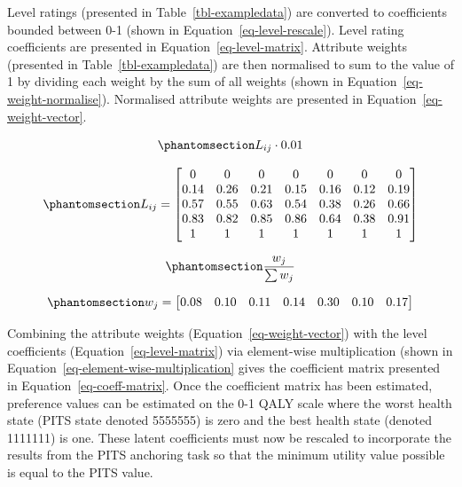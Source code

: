 \documentclass[
  letterpaper,
  DIV=11,
  numbers=noendperiod]{scrartcl}
\begin{document}
Level ratings (presented in Table~\ref{tbl-exampledata}) are converted
to coefficients bounded between 0-1 (shown in
Equation~\ref{eq-level-rescale}). Level rating coefficients are
presented in Equation~\ref{eq-level-matrix}. Attribute weights
(presented in Table~\ref{tbl-exampledata}) are then normalised to sum to
the value of 1 by dividing each weight by the sum of all weights (shown
in Equation~\ref{eq-weight-normalise}). Normalised attribute weights are
presented in Equation~\ref{eq-weight-vector}.

\begin{equation}\phantomsection\label{eq-level-rescale}{
    L_{ij} \cdot 0.01
}\end{equation}

\begin{equation}\phantomsection\label{eq-level-matrix}{
L_{ij} = 
\begin{bmatrix}
0 & 0 & 0 & 0 & 0 & 0 & 0 \\
0.14 & 0.26 & 0.21 & 0.15 & 0.16 & 0.12 & 0.19 \\
0.57 & 0.55 & 0.63 & 0.54 & 0.38 & 0.26 & 0.66 \\
0.83 & 0.82 & 0.85 & 0.86 & 0.64 & 0.38 & 0.91 \\
1 & 1 & 1 & 1 & 1 & 1 & 1 \\
\end{bmatrix}
}\end{equation}

\begin{equation}\phantomsection\label{eq-weight-normalise}{
    \frac{w_{j}}{\sum{w_j}}
}\end{equation}

\begin{equation}\phantomsection\label{eq-weight-vector}{
w_j = \begin{bmatrix}
    0.08& 0.10& 0.11& 0.14& 0.30& 0.10& 0.17
\end{bmatrix} 
}\end{equation}

Combining the attribute weights (Equation~\ref{eq-weight-vector}) with
the level coefficients (Equation~\ref{eq-level-matrix}) via element-wise
multiplication (shown in Equation~\ref{eq-element-wise-multiplication}
gives the coefficient matrix presented in
Equation~\ref{eq-coeff-matrix}. Once the coefficient matrix has been
estimated, preference values can be estimated on the 0-1 QALY scale
where the worst health state (PITS state denoted 5555555) is zero and
the best health state (denoted 1111111) is one. These latent
coefficients must now be rescaled to incorporate the results from the
PITS anchoring task so that the minimum utility value possible is equal
to the PITS value.
\end{document}
